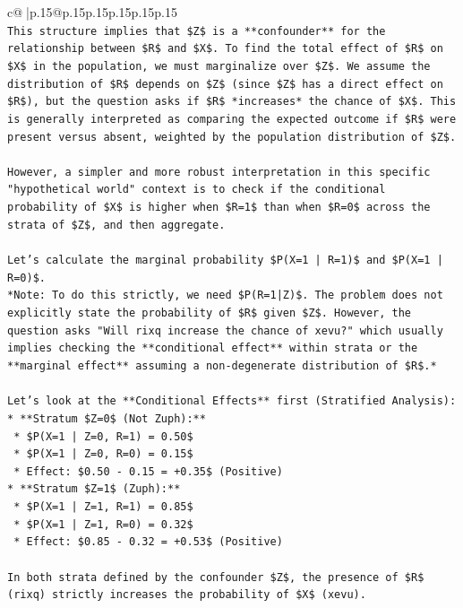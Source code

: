 \documentclass{article}
\begin{document}
{\begin{supertabular}{c@{$\;$}|p{.15\linewidth}@{}p{.15\linewidth}p{.15\linewidth}p{.15\linewidth}p{.15\linewidth}p{.15\linewidth}}
{{{\\ 
\texttt{This structure implies that \$Z\$ is a **confounder** for the relationship between \$R\$ and \$X\$. To find the total effect of \$R\$ on \$X\$ in the population, we must marginalize over \$Z\$. We assume the distribution of \$R\$ depends on \$Z\$ (since \$Z\$ has a direct effect on \$R\$), but the question asks if \$R\$ *increases* the chance of \$X\$. This is generally interpreted as comparing the expected outcome if \$R\$ were present versus absent, weighted by the population distribution of \$Z\$.} \\
\\ 
\texttt{However, a simpler and more robust interpretation in this specific "hypothetical world" context is to check if the conditional probability of \$X\$ is higher when \$R=1\$ than when \$R=0\$ across the strata of \$Z\$, and then aggregate.} \\
\\ 
\texttt{Let's calculate the marginal probability \$P(X=1 | R=1)\$ and \$P(X=1 | R=0)\$.} \\
\texttt{*Note: To do this strictly, we need \$P(R=1|Z)\$. The problem does not explicitly state the probability of \$R\$ given \$Z\$. However, the question asks "Will rixq increase the chance of xevu?" which usually implies checking the **conditional effect** within strata or the **marginal effect** assuming a non{-}degenerate distribution of \$R\$.*} \\
\\ 
\texttt{Let's look at the **Conditional Effects** first (Stratified Analysis):} \\
\texttt{*   **Stratum \$Z=0\$ (Not Zuph):**} \\
\texttt{    *   \$P(X=1 | Z=0, R=1) = 0.50\$} \\
\texttt{    *   \$P(X=1 | Z=0, R=0) = 0.15\$} \\
\texttt{    *   Effect: \$0.50 {-} 0.15 = +0.35\$ (Positive)} \\
\texttt{*   **Stratum \$Z=1\$ (Zuph):**} \\
\texttt{    *   \$P(X=1 | Z=1, R=1) = 0.85\$} \\
\texttt{    *   \$P(X=1 | Z=1, R=0) = 0.32\$} \\
\texttt{    *   Effect: \$0.85 {-} 0.32 = +0.53\$ (Positive)} \\
\\ 
\texttt{In both strata defined by the confounder \$Z\$, the presence of \$R\$ (rixq) strictly increases the probability of \$X\$ (xevu).} \\
}}}
\end{supertabular}}
\end{document}
